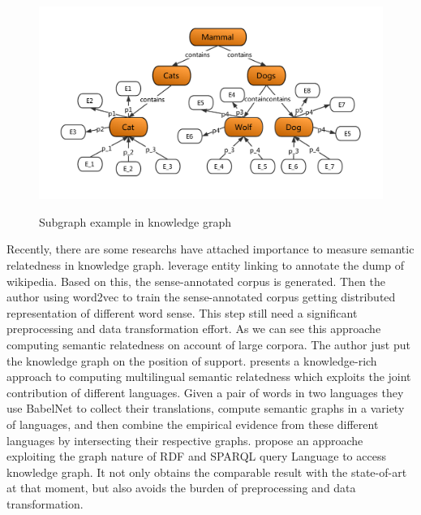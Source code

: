 \begin{figure}
    \centering
    \includegraphics[width=1.0\textwidth]{pic/weak1.pdf}\\
    \caption{Subgraph example in knowledge graph}
    \label{weak1}
\end{figure}

Recently, there are some researchs have attached importance to measure semantic relatedness
in knowledge graph\cite{aaai/Pirro12, aaai/NavigliP12, acl/IacobacciPN15}. 
\cite{acl/IacobacciPN15} leverage entity linking to annotate the dump of wikipedia. Based on this,
the sense-annotated corpus is generated. Then the author using word2vec to
train the sense-annotated corpus getting distributed representation of different 
word sense. This step still need a significant preprocessing and data transformation effort. 
As we can see this approache computing semantic relatedness on account of large corpora.
The author just put the knowledge graph on the position of support. 
\cite{aaai/NavigliP12} presents a knowledge-rich approach to computing multilingual semantic
relatedness which exploits the joint contribution of different languages. Given a pair of words 
in two languages they use BabelNet to collect their translations, compute semantic
graphs in a variety of languages, and then combine the empirical evidence from these 
different languages by intersecting their respective graphs.
\cite{aaai/Pirro12} propose an approache exploiting the graph nature of RDF and SPARQL query
Language to access knowledge graph. It not only obtains the comparable
result with the state-of-art at that moment, but also avoids the burden
of preprocessing and data transformation.




